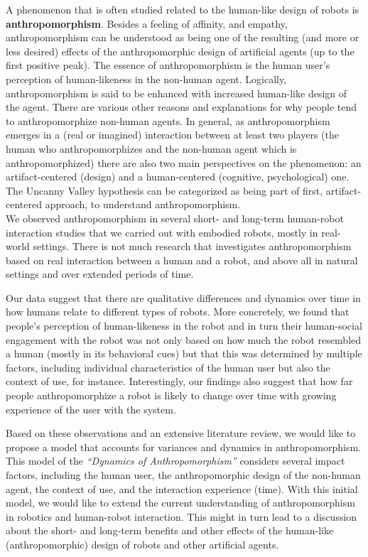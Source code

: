 \documentclass{frontiersSCNS} %
\begin{document}
A phenomenon that is often studied related to the human-like design of robots is \textbf{anthropomorphism}. Besides a feeling of affinity, and empathy, anthropomorphism can be understood as being one of the resulting (and  more or less desired) effects of the anthropomorphic design of artificial agents (up to the first positive peak). The essence of anthropomorphism is the human user's perception of human-likeness in the non-human agent. Logically, anthropomorphism is said to be enhanced with increased human-like design of the agent. There are various other reasons and explanations for why people tend to anthropomorphize non-human agents. In general, as anthropomorphism emerges in a (real or imagined) interaction \citep{persson_anthropomorphism_2000} between at least two players (the human who anthropomorphizes and the non-human agent which is anthropomorphized) there are also two main perspectives on the phenomenon: an artifact-centered (design) and a human-centered (cognitive, psychological) one. The Uncanny Valley hypothesis can be categorized as being part of first, artifact-centered approach, to understand anthropomorphism.\\

We observed anthropomorphism in several short- and long-term human-robot interaction studies that we carried out with embodied robots, mostly in real-world settings. There is not much research that investigates anthropomorphism based on real interaction between a human and a robot, and above all in natural settings and over extended periods of time. 

Our data suggest that there are qualitative differences and dynamics over time in how humans relate to different types of robots. More concretely, we found that people's perception of human-likeness in the robot and in turn their human-social engagement with the robot was not only based on how much the robot resembled a human (mostly in its behavioral cues)
but that this was determined by multiple factors, including individual
characteristics of the human user but also the context of use, for instance. Interestingly, our findings also suggest that how far people anthropomorphize a robot is likely to change over time with growing experience of the
user with the system. 

Based on these observations and an extensive literature review, we would like to propose a model that accounts for variances and dynamics in anthropomorphism. This model of the \textit{``Dynamics of Anthropomorphism''} considers several impact factors, including the human user, the anthropomorphic design of the non-human agent, the context of use, and the interaction experience (time). With this initial model, we would like to extend the current understanding of anthropomorphism in robotics and human-robot interaction. This might in turn lead to a discussion about the short- and long-term benefits and other effects of the human-like (anthropomorphic) design of robots and other artificial agents.\\
\end{document}
